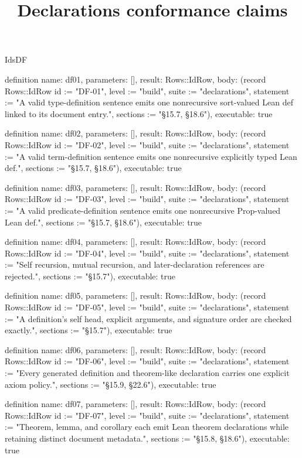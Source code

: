 \begin{lexlean}{IdsDF}
\title{Declarations conformance claims}
\begin{semanticmodule}
definition{
  name: df01,
  parameters: [],
  result: Rows::IdRow,
  body: (record Rows::IdRow {id := "DF-01", level := "build", suite := "declarations", statement := "A valid type-definition sentence emits one nonrecursive sort-valued Lean def linked to its document entry.", sections := "§15.7, §18.6"}),
  executable: true
}

definition{
  name: df02,
  parameters: [],
  result: Rows::IdRow,
  body: (record Rows::IdRow {id := "DF-02", level := "build", suite := "declarations", statement := "A valid term-definition sentence emits one nonrecursive explicitly typed Lean def.", sections := "§15.7, §18.6"}),
  executable: true
}

definition{
  name: df03,
  parameters: [],
  result: Rows::IdRow,
  body: (record Rows::IdRow {id := "DF-03", level := "build", suite := "declarations", statement := "A valid predicate-definition sentence emits one nonrecursive Prop-valued Lean def.", sections := "§15.7, §18.6"}),
  executable: true
}

definition{
  name: df04,
  parameters: [],
  result: Rows::IdRow,
  body: (record Rows::IdRow {id := "DF-04", level := "build", suite := "declarations", statement := "Self recursion, mutual recursion, and later-declaration references are rejected.", sections := "§15.7"}),
  executable: true
}

definition{
  name: df05,
  parameters: [],
  result: Rows::IdRow,
  body: (record Rows::IdRow {id := "DF-05", level := "build", suite := "declarations", statement := "A definition's self head, explicit arguments, and signature order are checked exactly.", sections := "§15.7"}),
  executable: true
}

definition{
  name: df06,
  parameters: [],
  result: Rows::IdRow,
  body: (record Rows::IdRow {id := "DF-06", level := "build", suite := "declarations", statement := "Every generated definition and theorem-like declaration carries one explicit axiom policy.", sections := "§15.9, §22.6"}),
  executable: true
}

definition{
  name: df07,
  parameters: [],
  result: Rows::IdRow,
  body: (record Rows::IdRow {id := "DF-07", level := "build", suite := "declarations", statement := "Theorem, lemma, and corollary each emit Lean theorem declarations while retaining distinct document metadata.", sections := "§15.8, §18.6"}),
  executable: true
}


\end{semanticmodule}
\end{lexlean}
